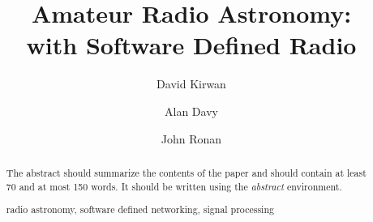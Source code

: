 \documentclass[runningheads,a4paper]{llncs}
\newcommand{\keywords}[1]{\par\addvspace\baselineskip
\noindent\keywordname\enspace\ignorespaces#1}
\begin{document}
\mainmatter  %

\title{Amateur Radio Astronomy:\\
with Software Defined Radio}


%
%
\author{David Kirwan%
\and Alan Davy\and John Ronan}
%


%
%

\maketitle


\begin{abstract}
The abstract should summarize the contents of the paper and should
contain at least 70 and at most 150 words. It should be written using the
\emph{abstract} environment.
\keywords{radio astronomy, software defined networking, signal processing}
\end{abstract}
\end{document}

